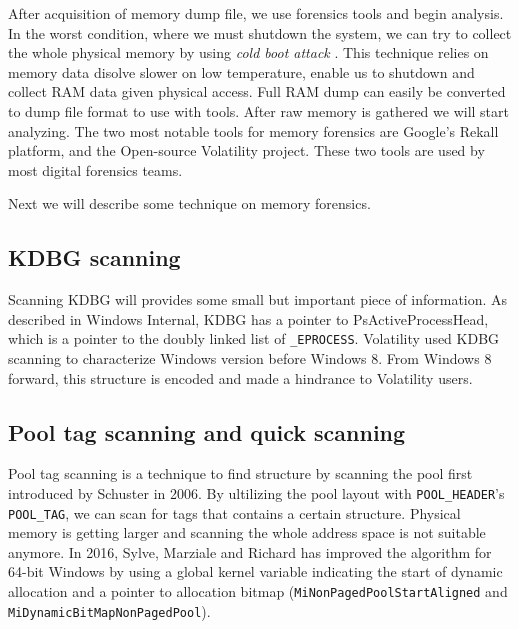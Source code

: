 After acquisition of memory dump file, we use forensics tools and begin analysis. In the worst condition, where we must shutdown the system, we can try to collect the whole physical memory by using \textit{cold boot attack} \cite{coldboot}. This technique relies on memory data disolve slower on low temperature, enable us to shutdown and collect RAM data given physical access. Full RAM dump can easily be converted to dump file format to use with tools. After raw memory is gathered we will start analyzing. The two most notable tools for memory forensics are Google's Rekall platform, and the Open-source Volatility project. These two tools are used by most digital forensics teams.

Next we will describe some technique on memory forensics.

\subsection[KDBG scanning]{KDBG scanning}

Scanning KDBG will provides some small but important piece of information. As described in Windows Internal, KDBG has a pointer to PsActiveProcessHead, which is a pointer to the doubly linked list of \texttt{\_EPROCESS}. Volatility used KDBG scanning to characterize Windows version before Windows 8. From Windows 8 forward, this structure is encoded and made a hindrance to Volatility users.

\subsection[Pool tag scanning and quick scanning]{Pool tag scanning and quick scanning}

Pool tag scanning is a technique to find structure by scanning the pool first introduced by Schuster \cite{pooltagscan} in 2006. By ultilizing the pool layout with \texttt{POOL\_HEADER}'s \texttt{POOL\_TAG}, we can scan for tags that contains a certain structure. Physical memory is getting larger and scanning the whole address space is not suitable anymore. In 2016, Sylve, Marziale and Richard \cite{sylve2016pool} has improved the algorithm for 64-bit Windows by using a global kernel variable indicating the start of dynamic allocation and a pointer to allocation bitmap (\texttt{MiNonPagedPoolStartAligned} and \texttt{MiDynamicBitMapNonPagedPool}).
